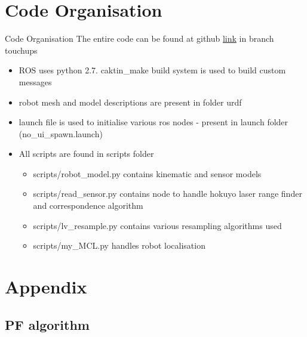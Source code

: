 \documentclass{beamer}
\begin{document}
\section{Code Organisation}
\begin{frame}{Code Organisation}
    The entire code can be found at github \href{https://github.com/aswinpajayan/localisation-mcl/tree/touchups}{link} in branch touchups
     \begin{itemize}
         \item ROS uses python 2.7. caktin\_make build system is used to build custom messages
         \item robot mesh and model descriptions are present in folder urdf
         \item launch file is used to initialise various ros nodes - present in launch folder (no\_ui\_spawn.launch)
         \item All scripts are found in scripts folder

            \begin{itemize}
                \item scripts/robot\_model.py contains kinematic and sensor models
                    \item scripts/read\_sensor.py contains node to handle hokuyo laser range finder and correspondence algorithm 
                    \item scripts/lv\_resample.py contains various resampling algorithms used
                    \item scripts/my\_MCL.py handles robot localisation
            \end{itemize}
     \end{itemize}
\end{frame}

\section{Appendix}
\subsection{PF algorithm}
\end{document}
